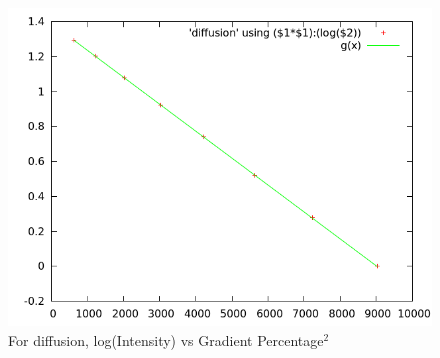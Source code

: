 		\begin{figure}[bth]
			\begin{center}
				\includegraphics[width=1.1\linewidth]{gfx/diffusionGraph}
			\end{center}
		\caption[log(Intensity) vs Gradient Percentage$^2$]{For diffusion, log(Intensity) vs Gradient Percentage$^2$}
		\label{e3diffusion}
		\end{figure}




